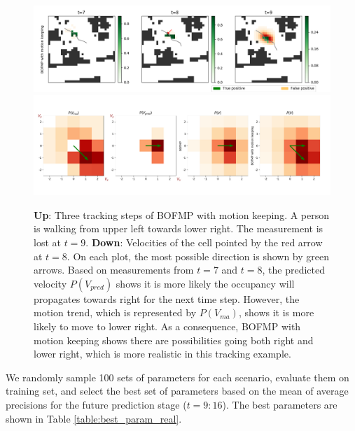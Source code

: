 \begin{figure}[ht]
\centering
\includegraphics[width=\textwidth]{figures/moving_average_tracking.png}
\includegraphics[width=\textwidth]{figures/moving_average_tracking_velocities_1.png}
\caption{\textbf{Up}: Three tracking steps of BOFMP with motion keeping. A person is walking from upper left towards lower right. The measurement is lost at $t=9$. \textbf{Down}: Velocities of the cell pointed by the red arrow at $t=8$. On each plot, the most possible direction is shown by green arrows. Based on measurements from $t=7$ and $t=8$, the predicted velocity $P(V_{pred})$ shows it is more likely the occupancy will propagates towards right for the next time step. However, the motion trend, which is represented by $P(V_{ma})$, shows it is more likely to move to lower right. As a consequence, BOFMP with motion keeping shows there are possibilities going both right and lower right, which is more realistic in this tracking example.}
\label{fig:keep_motion_idea}
\end{figure}


We randomly sample 100 sets of parameters for each scenario, evaluate them on training set, and select the best set of parameters based on the mean of average precisions for the future prediction stage ($t=9:16$). The best parameters are shown in Table \ref{table:best_param_real}.

